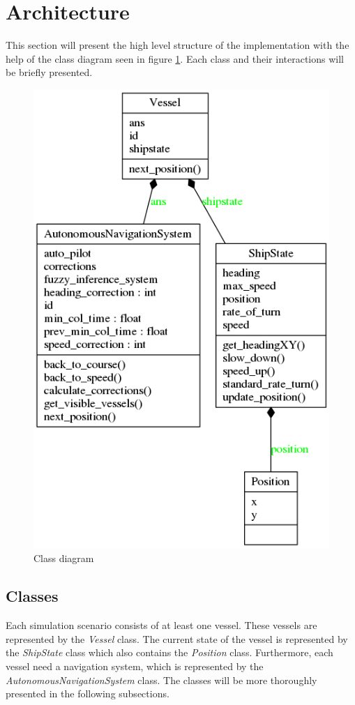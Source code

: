 \section{Architecture}
This section will present the high level structure of the implementation with the help of the class diagram seen in figure \ref{fig:class_diagram}. Each class and their interactions will be briefly presented.
\begin{figure}[H]
    \centering
    \includegraphics[width=\textwidth,height=0.75\textheight,keepaspectratio]{../src/classes_Pyreverse}
    \caption{Class diagram}
    \label{fig:class_diagram}
\end{figure}
\subsection{Classes}
Each simulation scenario consists of at least one vessel. These vessels are represented by the \textit{Vessel} class. The current state of the vessel is represented by the \textit{ShipState} class which also contains the \textit{Position} class. Furthermore, each vessel need a navigation system, which is represented by the \textit{AutonomousNavigationSystem} class. The classes will be more thoroughly presented in the following subsections.
